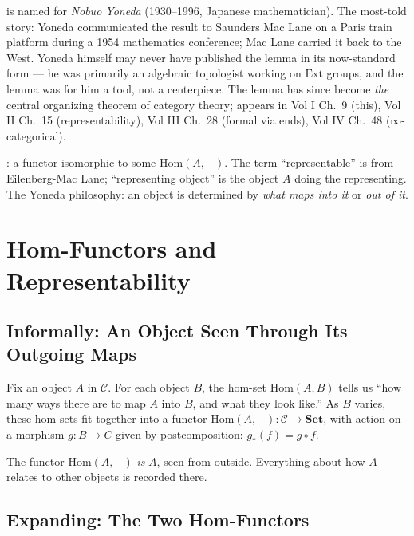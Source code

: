 \begin{nameorigin}
 is named for \emph{Nobuo Yoneda} (1930--1996,
Japanese mathematician). The most-told story: Yoneda communicated the
result to Saunders Mac Lane on a Paris train platform during a 1954
mathematics conference; Mac Lane carried it back to the West. Yoneda
himself may never have published the lemma in its now-standard form —
he was primarily an algebraic topologist working on $\mathrm{Ext}$
groups, and the lemma was for him a tool, not a centerpiece. The lemma
has since become \emph{the} central organizing theorem of category
theory; appears in Vol I Ch.~9 (this), Vol II Ch.~15 (representability),
Vol III Ch.~28 (formal via ends), Vol IV Ch.~48 ($\infty$-categorical).

: a functor isomorphic to some
$\mathrm{Hom}(A, -)$. The term ``representable'' is from
Eilenberg-Mac Lane; ``representing object'' is the object $A$ doing
the representing. The Yoneda philosophy: an object is determined by
\emph{what maps into it} or \emph{out of it}.
\end{nameorigin}

\section{Hom-Functors and Representability}
\label{sec:hom-functors}

\subsection{Informally: An Object Seen Through Its Outgoing Maps}

Fix an object $A$ in $\mathcal{C}$. For each object $B$, the hom-set
$\mathrm{Hom}(A, B)$ tells us ``how many ways there are to map $A$ into
$B$, and what they look like.'' As $B$ varies, these hom-sets fit
together into a functor $\mathrm{Hom}(A, -) : \mathcal{C} \to
\mathbf{Set}$, with action on a morphism $g : B \to C$ given by
postcomposition: $g_* (f) = g \circ f$.

The functor $\mathrm{Hom}(A, -)$ \emph{is} $A$, seen from outside.
Everything about how $A$ relates to other objects is recorded there.

\subsection{Expanding: The Two Hom-Functors}

